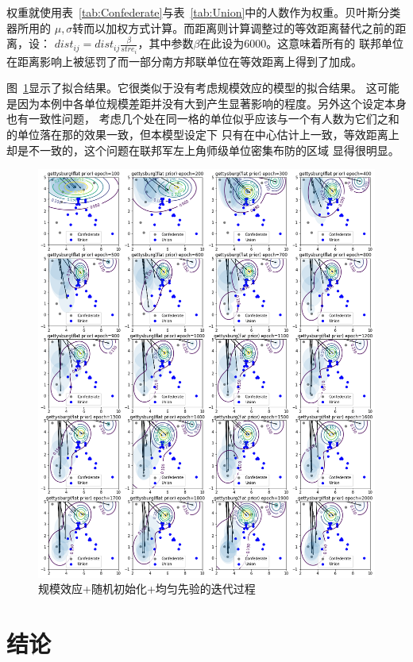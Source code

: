 \documentclass{sicnuthesis}
\begin{document}
权重就使用表~\ref{tab:Confederate}与表~\ref{tab:Union}中的人数作为权重。贝叶斯分类器所用的
$\mu,\sigma$转而以加权方式计算。而距离则计算调整过的等效距离替代之前的距离，设：
$dist_{ij} = dist_{ij} \frac{\beta}{stre_i}$，其中参数$\beta$在此设为$6000$。这意味着所有的
联邦单位在距离影响上被惩罚了而一部分南方邦联单位在等效距离上得到了加成。

图~\ref{fig:gettysburgInitTwo}显示了拟合结果。它很类似于没有考虑规模效应的模型的拟合结果。
这可能是因为本例中各单位规模差距并没有大到产生显著影响的程度。另外这个设定本身也有一致性问题，
考虑几个处在同一格的单位似乎应该与一个有人数为它们之和的单位落在那的效果一致，但本模型设定下
只有在中心估计上一致，等效距离上却是不一致的，这个问题在联邦军左上角师级单位密集布防的区域
显得很明显。

\begin{figure}[htb]
\includegraphics[width=0.99\linewidth]{gettysburg-init2.png}
\caption{
规模效应+随机初始化+均匀先验的迭代过程}
\label{fig:gettysburgInitTwo}
\end{figure}


\section{结论}
\end{document}
